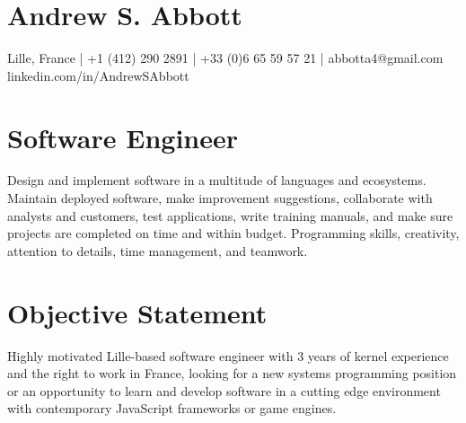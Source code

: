 \documentclass[letterpaper,10pt]{article}
\begin{document}
\pagestyle{empty}

\large\section{Andrew S. Abbott}
\normalsize
\begin{center}
  Lille, France |
  +1 (412) 290 2891 |
  +33 (0)6 65 59 57 21 |
  abbotta4@gmail.com\\
  linkedin.com/in/AndrewSAbbott\par
\end{center}

\section{Software Engineer}
Design and implement software in a multitude of languages and ecosystems. Maintain deployed software, make improvement suggestions, collaborate with analysts and customers, test applications, write training manuals, and make sure projects are completed on time and within budget. Programming skills, creativity, attention to details, time management, and teamwork.

\section{Objective Statement}
Highly motivated Lille-based software engineer with 3 years of kernel experience and the right to work in France, looking for a new systems programming position or an opportunity to learn and develop software in a cutting edge environment with contemporary JavaScript frameworks or game engines.
\end{document}
